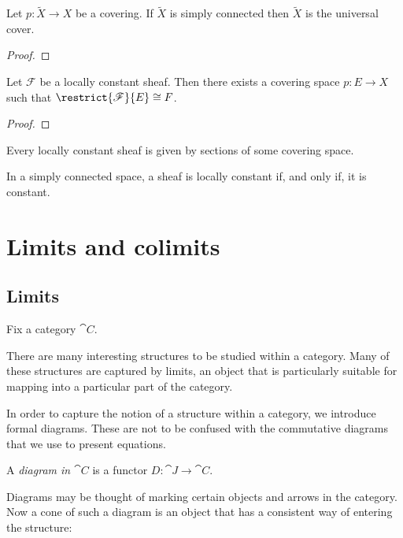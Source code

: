 \documentclass{article}
\begin{document}
\begin{theorem}
  Let $p:\tilde X\to X$ be a covering. If $\tilde X$ is simply connected then
  $\tilde X$ is the universal cover.
  \begin{proof}
    \missingproof
  \end{proof}
\end{theorem}

\begin{theorem}
  Let $\mathscr F$ be a locally constant sheaf. Then there exists a covering
  space $p:E\to X$ such that $\restrict{\mathscr F}{E} \cong F$.
  \begin{proof}
    \missingproof
  \end{proof}
\end{theorem}

\begin{theorem}
  Every locally constant sheaf is given by sections of some covering space.
\end{theorem}

\begin{theorem}
  In a simply connected space, a sheaf is locally constant if, and only if,
  it is constant.
\end{theorem}

\section{Limits and colimits}

\subsection{Limits}

Fix a category $\cat{C}$.

There are many interesting structures to be studied within a category. Many of these
structures are captured by limits, an object that is particularly suitable
for mapping into a particular part of the category.

In order to capture the notion of a structure within a category, we introduce
formal diagrams. These are not to be confused with the commutative diagrams that
we use to present equations.

\begin{definition}
  A \emph{diagram in $\cat{C}$} is a functor $D:\cat{J}\to\cat{C}$.
\end{definition}

Diagrams may be thought of marking certain objects and arrows in the category.
Now a cone of such a diagram is an object that has a consistent way of entering
the structure:
\end{document}
